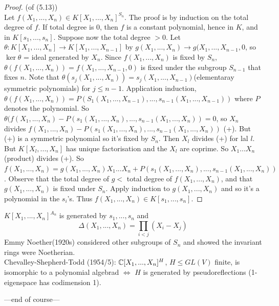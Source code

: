 \documentclass[a4paper]{article}
\begin{document}
\begin{proof} (of (5.13))\\
Let $f(X_1,...,X_n) \in K[X_1,...,X_n]^{S_n}$. The proof is by induction on the total degree of $f$. If total degree is $0$, then $f$ is a constant polynomial, hence in $K$, and in $K[s_1,...,s_n]$. Suppose now the total degree $>0$. Let $\theta:K[X_1,...,X_n] \to K[X_1,...,X_{n-1}]$ by $g(X_1,...,X_n) \to g(X_1,...,X_{n-1},0$, so $\ker \theta$ = ideal generated by $X_n$. Since $f(X_1,...,X_n)$ is fixed by $S_n$, $\theta(f(X_1,...,X_n)) = f(X_1,...,X_{n-1},0)$ is fixed under the subgroup $S_{n-1}$ that fixes $n$. Note that $\theta(s_j(X_1,...,X_n)) = s_j(X_1,...,X_{n-1})$(elementaray symmetric polynomials) for $j \leq n-1$. Application induction, $\theta(f(X_1,...,X_n)) = P(S_1(X_1,...,X_{n-1}),...,s_{n-1}(X_1,...,X_{n-1}))$ where $P$ denotes the polynomial. So $\theta(f(X_1,...,X_n)-P(s_1(X_1,...,X_n),...,s_{n-1}(X_1,...,X_n)) = 0$, so $X_n$ divides $f(X_1,...,X_n) - P(s_1(X_1,...,X_n),...,s_{n-1}(X_1,...,X_n))$ (+). But (+) is a symmetric polynomial so it's fixed by $S_n$. Then $X_l$ divides (+) for lal $l$. But $K[X_l,...,X_n]$ has unique factorisation and the $X_l$ are coprime. So $X_1...X_n$ (product) divides (+). So $f(X_1,...,X_n) = g(X_1,...,X_n)X_1...X_n + P(s_1(X_1,...,X_n),...,s_{n-1}(X_1,...,X_n))$. Observe that the total degree of $g <$ total degree of $f(X_1,...,X_n)$, and that $g(X_1,...,X_n)$ is fixed under $S_n$. Apply induction to $g(X_1,...,X_n)$ and so it's a polynomial in the $s_i$'s. Thus $f(X_1,...,X_n) \in K[s_1,...,s_n]$.
\end{proof}

\begin{eg}
$K[X_1,...,X_n]^{A_n}$ is generated by $s_1,...,s_n$ and $$\Delta(X_1,...,X_n) = \prod_{i < j} (X_i-X_j)$$ Emmy Noether(1920s) considered other subgroups of $S_n$ and showed the invariant rings were Noetherian.\\
Chevalley-Shepherd-Todd (1954/5): $\mathbb{C}[X_1,...,X_n]^H$, $H \leq GL(V)$ finite, is isomorphic to a polynomial algebrad $\iff$ $H$ is generated by pseudoreflections (1-eigenspace has codimension 1).
\end{eg}

---end of course---
\end{document}
